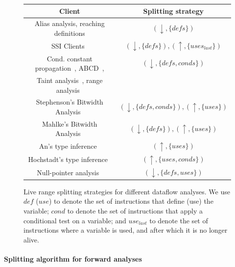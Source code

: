 \begin{figure}[t!]
\begin{center}
\begin{small}
\renewcommand\arraystretch{1.4}
\begin{tabular}{| c | c |} \hline
{\bf Client} & {\bf Splitting strategy} \\ \hline
Alias analysis, reaching definitions & $(\downarrow, \{\mathit{defs}\})$ \\ \hline
SSI Clients~\cite{Ananian99,Singer06} & $(\downarrow,
\{\mathit{defs}\}), (\uparrow, \{\mathit{uses}_{last}\})$ \\ \hline
Cond. constant propagation~\cite{Wegman91}, ABCD~\cite{Bodik00},
 & $(\downarrow, \{\mathit{defs},
\mathit{conds}\})$ \\
Taint analysis~\cite{Rimsa11}, range analysis~\cite{Su05,Gawlitza09} & \\ \hline
Stephenson's Bitwidth Analysis~\cite{Stephenson00} & $(\downarrow,
\{\mathit{defs}, \mathit{conds}\}), (\uparrow, \{\mathit{uses}\})$  \\ \hline
Mahlke's Bitwidth Analysis~\cite{Mahlke01} & $(\downarrow, \{\mathit{defs}\}),
(\uparrow, \{\mathit{uses}\})$  \\ \hline
An's type inference~\cite{An11} & $(\uparrow, \{\mathit{uses}\})$ \\ \hline
Hochstadt's type inference~\cite{Hochstadt08} &
$(\uparrow, \{\mathit{uses}, \mathit{conds}\})$ \\ \hline
Null-pointer analysis~\cite{Nanda09} & $(\downarrow, \{\mathit{defs},
\mathit{uses}\})$ \\ \hline
\end{tabular}
\end{small}
\caption{Live range splitting strategies for different dataflow analyses.
We use $\mathit{def}$ ($\mathit{use}$) to denote the set of instructions that
define (use) the variable;
$\mathit{cond}$ to denote the set of instructions that apply a conditional
test on a variable; and
$\mathit{use}_{last}$ to denote the set of instructions where a
variable is used, and after which it is no longer alive.}
\label{fig:splittingSt}
\end{center}
\end{figure}

\paragraph{Splitting algorithm for forward analyses}

